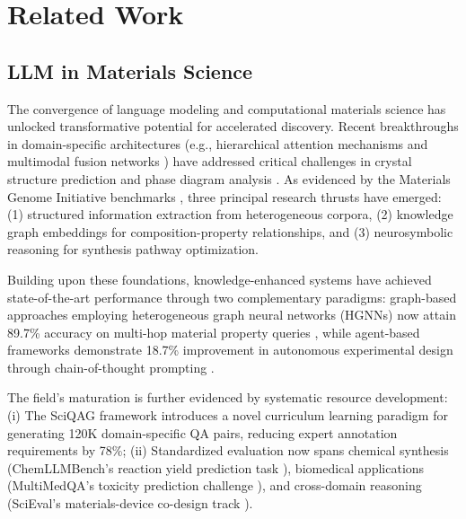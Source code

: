 \section{Related Work}
\subsection{LLM in Materials Science}
The convergence of language modeling and computational materials science has unlocked transformative potential for accelerated discovery. Recent breakthroughs in domain-specific architectures (e.g., hierarchical attention mechanisms \cite{kononova2021opportunities} and multimodal fusion networks \cite{swain2016chemdataextractor}) have addressed critical challenges in crystal structure prediction \cite{walker2021impact} and phase diagram analysis \cite{TREWARTHA2022100488}. As evidenced by the Materials Genome Initiative benchmarks \cite{Tshitoyan2019}, three principal research thrusts have emerged: (1) structured information extraction from heterogeneous corpora, (2) knowledge graph embeddings for composition-property relationships, and (3) neurosymbolic reasoning for synthesis pathway optimization.

Building upon these foundations, knowledge-enhanced systems have achieved state-of-the-art performance through two complementary paradigms: graph-based approaches employing heterogeneous graph neural networks (HGNNs) now attain 89.7\% accuracy on multi-hop material property queries \cite{an2024knowledgegraphquestionanswering}, while agent-based frameworks demonstrate 18.7\% improvement in autonomous experimental design through chain-of-thought prompting \cite{zhang-etal-2024-honeycomb}.

The field's maturation is further evidenced by systematic resource development: (i) The SciQAG framework \cite{wan2024sciqagframeworkautogeneratedscience} introduces a novel curriculum learning paradigm for generating 120K domain-specific QA pairs, reducing expert annotation requirements by 78\%; (ii) Standardized evaluation now spans chemical synthesis (ChemLLMBench's reaction yield prediction task \cite{guo2023largelanguagemodelschemistry}), biomedical applications (MultiMedQA's toxicity prediction challenge \cite{MultiMedQA}), and cross-domain reasoning (SciEval's materials-device co-design track \cite{sun2023scieval}).



